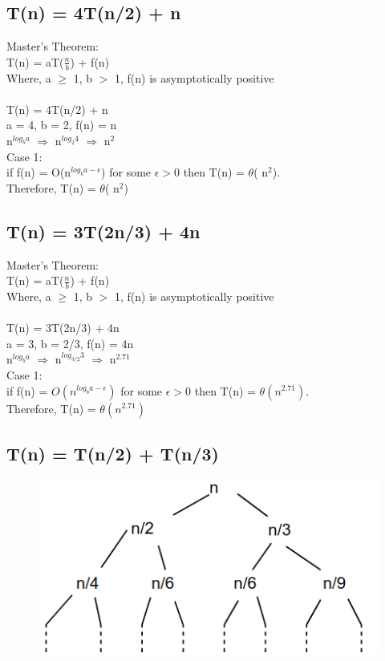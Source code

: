 \documentclass[10pt,letterpaper]{article}
\begin{document}
\subsection{T(n) = 4T(n/2) + n}
Master's Theorem:\\
T(n) = aT($\frac{n}{b}$) + f(n)\\
Where, a $\geq$ 1, b $>$ 1, f(n) is asymptotically positive\\
\\
T(n) = 4T(n/2) + n\\
a = 4, b = 2, f(n) = n\\
n$^{log_{b}a}$ $\Rightarrow$ n$^{log_{2}4}$ $\Rightarrow$ n$^{2}$\\
Case 1:\\
if f(n) = O(n$^{log_{b}a - \epsilon}$) for some $\epsilon > 0$ then T(n) = $\theta$( n$^{2}$).\\
Therefore, T(n) =  $\theta$( n$^{2}$)

\subsection{T(n) = 3T(2n/3) + 4n}
Master's Theorem:\\
T(n) = aT($\frac{n}{b}$) + f(n)\\
Where, a $\geq$ 1, b $>$ 1, f(n) is asymptotically positive\\
\\
T(n) = 3T(2n/3) + 4n\\
a = 3, b = 2/3, f(n) = 4n\\
n$^{log_{b}a}$ $\Rightarrow$ n$^{log_{3/2}3}$ $\Rightarrow$ n$^{2.71}$\\
Case 1:\\
if f(n) = $O(n^{log_{b}a - \epsilon})$ for some $\epsilon > 0$ then T(n) = $\theta(n^{2.71})$.\\
Therefore, T(n) =  $\theta(n^{2.71})$

\subsection{T(n) = T(n/2) + T(n/3)}

\begin{figure}[h]
	\includegraphics[scale = .25]{recurtree1hw5.png}
\end{figure}
\end{document}
